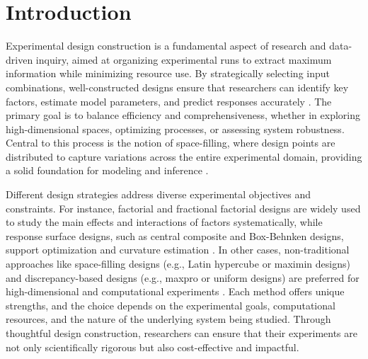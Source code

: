 \documentclass [PhD] {package/uclathes}
\begin{document}
\section{Introduction}




Experimental design construction is a fundamental aspect of research and data-driven inquiry, aimed at organizing experimental runs to extract maximum information while minimizing resource use. By strategically selecting input combinations, well-constructed designs ensure that researchers can identify key factors, estimate model parameters, and predict responses accurately \parencite{montgomery2017design}. The primary goal is to balance efficiency and comprehensiveness, whether in exploring high-dimensional spaces, optimizing processes, or assessing system robustness. Central to this process is the notion of space-filling, where design points are distributed to capture variations across the entire experimental domain, providing a solid foundation for modeling and inference \parencite{santner2003design}.

Different design strategies address diverse experimental objectives and constraints. For instance, factorial and fractional factorial designs are widely used to study the main effects and interactions of factors systematically, while response surface designs, such as central composite and Box-Behnken designs, support optimization and curvature estimation \parencite{myers2016response}. In other cases, non-traditional approaches like space-filling designs (e.g., Latin hypercube or maximin designs) and discrepancy-based designs (e.g., maxpro or uniform designs) are preferred for high-dimensional and computational experiments \parencite{joseph2016space}. Each method offers unique strengths, and the choice depends on the experimental goals, computational resources, and the nature of the underlying system being studied. Through thoughtful design construction, researchers can ensure that their experiments are not only scientifically rigorous but also cost-effective and impactful.
\end{document}
